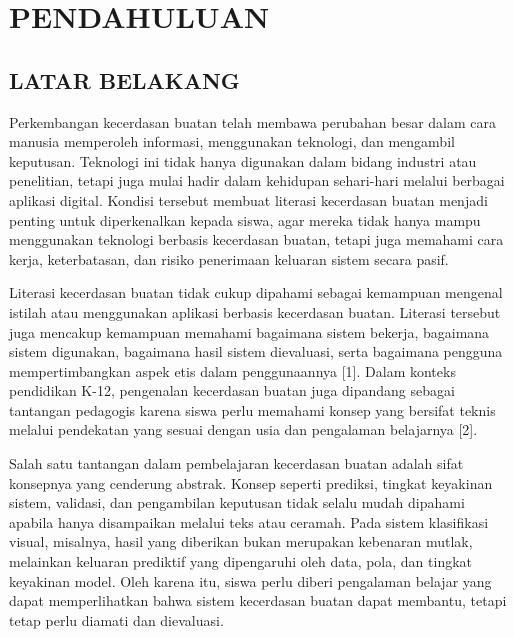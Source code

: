 \documentclass[10pt,twoside,openright]{report}
\begin{document}
\tableofcontents

\clearpage


\chapter{PENDAHULUAN}
\label{chap:bab1}

\section{LATAR BELAKANG}
\label{sec:latar-belakang}

Perkembangan kecerdasan buatan telah membawa perubahan besar dalam cara manusia memperoleh informasi, menggunakan teknologi, dan mengambil keputusan. Teknologi ini tidak hanya digunakan dalam bidang industri atau penelitian, tetapi juga mulai hadir dalam kehidupan sehari-hari melalui berbagai aplikasi digital. Kondisi tersebut membuat literasi kecerdasan buatan menjadi penting untuk diperkenalkan kepada siswa, agar mereka tidak hanya mampu menggunakan teknologi berbasis kecerdasan buatan, tetapi juga memahami cara kerja, keterbatasan, dan risiko penerimaan keluaran sistem secara pasif.

Literasi kecerdasan buatan tidak cukup dipahami sebagai kemampuan mengenal istilah atau menggunakan aplikasi berbasis kecerdasan buatan. Literasi tersebut juga mencakup kemampuan memahami bagaimana sistem bekerja, bagaimana sistem digunakan, bagaimana hasil sistem dievaluasi, serta bagaimana pengguna mempertimbangkan aspek etis dalam penggunaannya [1]. Dalam konteks pendidikan K-12, pengenalan kecerdasan buatan juga dipandang sebagai tantangan pedagogis karena siswa perlu memahami konsep yang bersifat teknis melalui pendekatan yang sesuai dengan usia dan pengalaman belajarnya [2].

Salah satu tantangan dalam pembelajaran kecerdasan buatan adalah sifat konsepnya yang cenderung abstrak. Konsep seperti prediksi, tingkat keyakinan sistem, validasi, dan pengambilan keputusan tidak selalu mudah dipahami apabila hanya disampaikan melalui teks atau ceramah. Pada sistem klasifikasi visual, misalnya, hasil yang diberikan bukan merupakan kebenaran mutlak, melainkan keluaran prediktif yang dipengaruhi oleh data, pola, dan tingkat keyakinan model. Oleh karena itu, siswa perlu diberi pengalaman belajar yang dapat memperlihatkan bahwa sistem kecerdasan buatan dapat membantu, tetapi tetap perlu diamati dan dievaluasi.
\end{document}

